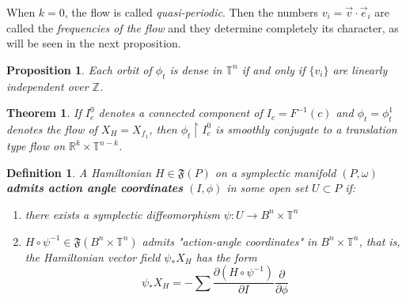 \documentclass{article}
\newtheorem{thm}{Theorem}
\newtheorem{defn}{Definition}
\newtheorem{prop}{Proposition}
\begin{document}
When $k=0$, the flow is called \textit{quasi-periodic}. Then the numbers $v_i = \vec{v} \cdot \vec{e}_i$ are called the \textit{frequencies of the flow} and they determine completely its character, as will be seen in the next proposition.

\begin{prop}
    Each orbit of $\phi_t$ is dense in $\mathbb{T}^n$ if and only if $\{v_i\}$ are linearly independent over $\mathbb{Z}$.
\end{prop}

\begin{thm}
    If $I^0_c$ denotes a connected component of $I_c = F^{-1}(c)$ and $\phi_t = \phi^1_t$ denotes the flow of $X_H=X_{f_1}$, then $\phi_t \restriction I^0_c$ is smoothly conjugate to a translation type flow on $\mathbb{R}^k \times \mathbb{T}^{n-k}$.
\end{thm}

\begin{defn}
    A Hamiltonian $H \in \mathfrak{F}(P)$ on a symplectic manifold $(P,\omega)$ \textbf{admits action angle coordinates} $(I,\phi)$ in some open set $U \subset P$ if:

    \begin{enumerate}
        \item there exists a symplectic diffeomorphism $\psi: U \to B^n \times \mathbb{T}^n$
        \item $H \circ \psi^{-1} \in \mathfrak{F}(B^n \times \mathbb{T}^n)$ admits "action-angle coordinates" in $B^n \times \mathbb{T}^n$, that is, the Hamiltonian vector field $\psi_*X_H$ has the form
        \[ \psi_*X_H = - \sum \frac{\partial (H \circ \psi^{-1})}{\partial I} \frac{\partial}{\partial \phi} \]
    \end{enumerate}
\end{defn}
\end{document}
